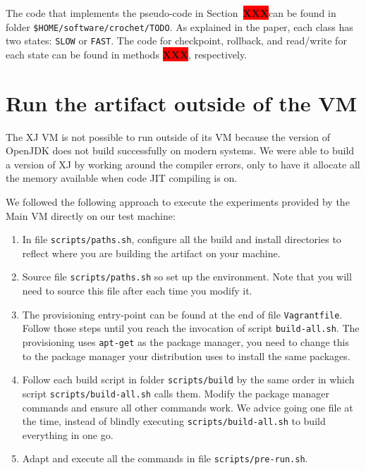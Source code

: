 \documentclass[12pt]{article}
\newcommand{\host}[1]{\colorbox{blue!20}{\texttt{\color{black}#1}}}
\newcommand{\vm}[1]{\colorbox{green!20}{\texttt{\color{black}#1}}}
\newcommand{\XXX}{\colorbox{red}{\bf\color{white}XXX}}
\begin{document}
The code that implements the pseudo-code in Section~\XXX can be found in folder
\vm{\$HOME/software/crochet/TODO}.  As explained in the paper, each class
has two states:  \texttt{SLOW} or \texttt{FAST}.  The code for checkpoint,
rollback, and read/write for each state can be found in methods \XXX,
respectively.

\section{Run the artifact outside of the VM}
\label{sec:extract}
\label{sec:last}

The XJ VM is not possible to run outside of its VM because the version of
OpenJDK does not build successfully on modern systems.  We were able to build a
version of XJ by working around the compiler errors, only to have it allocate
all the memory available when code JIT compiling is on.

We followed the following approach to execute the experiments provided by the
Main VM directly on our test machine:

\begin{enumerate}

    \item In file \host{scripts/paths.sh}, configure all the build and install
        directories to reflect where you are building the artifact on your
        machine.

    \item Source file \host{scripts/paths.sh} so set up the environment.  Note
        that you will need to source this file after each time you modify it.

    \item The provisioning entry-point can be found at the end of file
        \host{Vagrantfile}.  Follow those steps until you reach the invocation
        of script \texttt{build-all.sh}. The provisioning uses \texttt{apt-get}
        as the package manager, you need to change this to the package manager
        your distribution uses to install the same packages.

    \item Follow each build script in folder \host{scripts/build} by the same
        order in which script \host{scripts/build-all.sh} calls them.  Modify
        the package manager commands and ensure all other commands work.  We
        advice going one file at the time, instead of blindly executing
        \host{scripts/build-all.sh} to build everything in one go.

    \item Adapt and execute all the commands in file
        \host{scripts/pre-run.sh}.

\end{enumerate}
\end{document}
